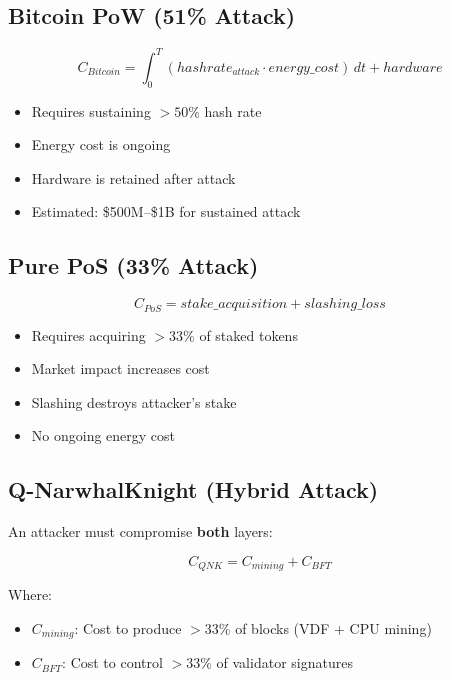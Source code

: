 \documentclass[11pt,a4paper]{article}
\begin{document}
\subsection{Bitcoin PoW (51\% Attack)}

\begin{equation}
    C_{Bitcoin} = \int_0^T (hashrate_{attack} \cdot energy\_cost) \, dt + hardware
\end{equation}

\begin{itemize}
    \item Requires sustaining $> 50\%$ hash rate
    \item Energy cost is ongoing
    \item Hardware is retained after attack
    \item Estimated: \$500M--\$1B for sustained attack
\end{itemize}

\subsection{Pure PoS (33\% Attack)}

\begin{equation}
    C_{PoS} = stake\_acquisition + slashing\_loss
\end{equation}

\begin{itemize}
    \item Requires acquiring $> 33\%$ of staked tokens
    \item Market impact increases cost
    \item Slashing destroys attacker's stake
    \item No ongoing energy cost
\end{itemize}

\subsection{Q-NarwhalKnight (Hybrid Attack)}

An attacker must compromise \textbf{both} layers:

\begin{equation}
    C_{QNK} = C_{mining} + C_{BFT}
\end{equation}

Where:
\begin{itemize}
    \item $C_{mining}$: Cost to produce $> 33\%$ of blocks (VDF + CPU mining)
    \item $C_{BFT}$: Cost to control $> 33\%$ of validator signatures
\end{itemize}
\end{document}

